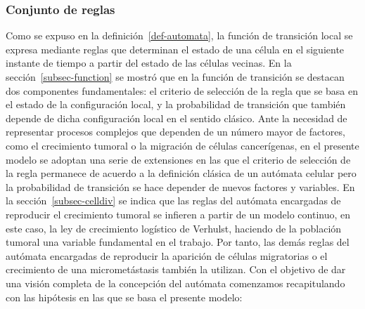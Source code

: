 \begin{algorithm}[h!]
\caption{Implementaci\'on del m\'etodo $update-synchronous-cells(G,\,C^S(G),\,S(n))$ encargado de la actualizaci\'on del conjunto s\'incrono que contiene a las c\'elulas normales, tumorales y las pertenecientes a las micromet\'astasis.} \label{alg-update-r-5}
\end{algorithm}

\begin{algorithm}[h!]
\caption{Implementaci\'on del m\'etodo $check-micrometastasis-colonization$ $(L_{mic}(n),\,S(n),\,\psi_{mic})$ encargado de verificar la colonizaci\'on satisfactoria del entorno por parte de las micromet\'astasis.} \label{alg-update-r-6}
\end{algorithm}

\subsubsection{Conjunto de reglas}
Como se expuso en la definici\'on~\ref{def-automata}, la funci\'on de transici\'on local se expresa mediante reglas que determinan el estado de una c\'elula en el siguiente instante de tiempo a partir del estado de las c\'elulas vecinas. En la secci\'on~\ref{subsec-function} se mostr\'o que en la funci\'on de transici\'on se destacan dos componentes fundamentales: el criterio de selecci\'on de la regla que se basa en el estado de la configuraci\'on local, y la probabilidad de transici\'on que tambi\'en depende de dicha configuraci\'on local en el sentido cl\'asico. Ante la necesidad de representar procesos complejos que dependen de un n\'umero mayor de factores, como el crecimiento tumoral o la migraci\'on de c\'elulas cancer\'igenas, en el presente modelo se adoptan una serie de extensiones en las que el criterio de selecci\'on de la regla permanece de acuerdo a la definici\'on cl\'asica de un aut\'omata celular pero la probabilidad de transici\'on se hace depender de nuevos factores y variables. En la secci\'on~\ref{subsec-celldiv} se indica que las reglas del aut\'omata encargadas de reproducir el crecimiento tumoral se infieren a partir de un modelo continuo, en este caso, la ley de crecimiento log\'istico de Verhulst, haciendo de la poblaci\'on tumoral una variable fundamental en el trabajo. Por tanto, las dem\'as reglas del aut\'omata encargadas de reproducir la aparici\'on de c\'elulas migratorias o el crecimiento de una micromet\'astasis tambi\'en la utilizan. Con el objetivo de dar una visi\'on completa de la concepci\'on del aut\'omata comenzamos recapitulando con las hip\'otesis en las que se basa el presente modelo:

